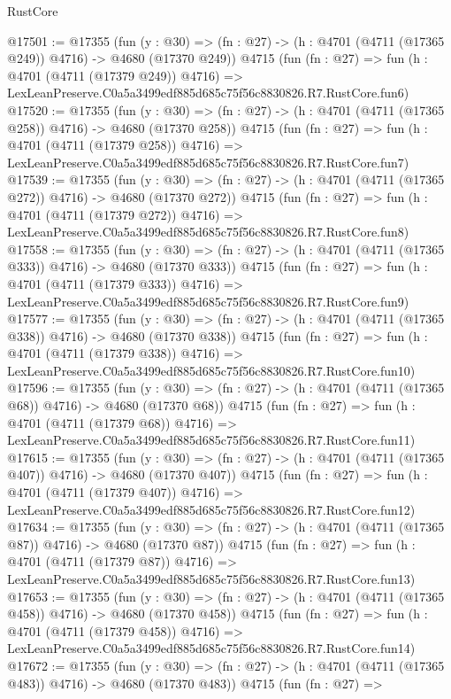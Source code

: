 \begin{lexlean}{RustCore}
\begin{coremodule}
@17501 := @17355
    (fun (y : @30) => (fn : @27) -> (h : @4701 (@4711 (@17365 @249)) @4716) -> @4680 (@17370 @249))
    @4715
    (fun (fn : @27) =>
    fun (h : @4701 (@4711 (@17379 @249)) @4716) =>
    LexLeanPreserve.C0a5a3499edf885d685c75f56c8830826.R7.RustCore.fun6)
@17520 := @17355
    (fun (y : @30) => (fn : @27) -> (h : @4701 (@4711 (@17365 @258)) @4716) -> @4680 (@17370 @258))
    @4715
    (fun (fn : @27) =>
    fun (h : @4701 (@4711 (@17379 @258)) @4716) =>
    LexLeanPreserve.C0a5a3499edf885d685c75f56c8830826.R7.RustCore.fun7)
@17539 := @17355
    (fun (y : @30) => (fn : @27) -> (h : @4701 (@4711 (@17365 @272)) @4716) -> @4680 (@17370 @272))
    @4715
    (fun (fn : @27) =>
    fun (h : @4701 (@4711 (@17379 @272)) @4716) =>
    LexLeanPreserve.C0a5a3499edf885d685c75f56c8830826.R7.RustCore.fun8)
@17558 := @17355
    (fun (y : @30) => (fn : @27) -> (h : @4701 (@4711 (@17365 @333)) @4716) -> @4680 (@17370 @333))
    @4715
    (fun (fn : @27) =>
    fun (h : @4701 (@4711 (@17379 @333)) @4716) =>
    LexLeanPreserve.C0a5a3499edf885d685c75f56c8830826.R7.RustCore.fun9)
@17577 := @17355
    (fun (y : @30) => (fn : @27) -> (h : @4701 (@4711 (@17365 @338)) @4716) -> @4680 (@17370 @338))
    @4715
    (fun (fn : @27) =>
    fun (h : @4701 (@4711 (@17379 @338)) @4716) =>
    LexLeanPreserve.C0a5a3499edf885d685c75f56c8830826.R7.RustCore.fun10)
@17596 := @17355
    (fun (y : @30) => (fn : @27) -> (h : @4701 (@4711 (@17365 @68)) @4716) -> @4680 (@17370 @68))
    @4715
    (fun (fn : @27) =>
    fun (h : @4701 (@4711 (@17379 @68)) @4716) =>
    LexLeanPreserve.C0a5a3499edf885d685c75f56c8830826.R7.RustCore.fun11)
@17615 := @17355
    (fun (y : @30) => (fn : @27) -> (h : @4701 (@4711 (@17365 @407)) @4716) -> @4680 (@17370 @407))
    @4715
    (fun (fn : @27) =>
    fun (h : @4701 (@4711 (@17379 @407)) @4716) =>
    LexLeanPreserve.C0a5a3499edf885d685c75f56c8830826.R7.RustCore.fun12)
@17634 := @17355
    (fun (y : @30) => (fn : @27) -> (h : @4701 (@4711 (@17365 @87)) @4716) -> @4680 (@17370 @87))
    @4715
    (fun (fn : @27) =>
    fun (h : @4701 (@4711 (@17379 @87)) @4716) =>
    LexLeanPreserve.C0a5a3499edf885d685c75f56c8830826.R7.RustCore.fun13)
@17653 := @17355
    (fun (y : @30) => (fn : @27) -> (h : @4701 (@4711 (@17365 @458)) @4716) -> @4680 (@17370 @458))
    @4715
    (fun (fn : @27) =>
    fun (h : @4701 (@4711 (@17379 @458)) @4716) =>
    LexLeanPreserve.C0a5a3499edf885d685c75f56c8830826.R7.RustCore.fun14)
@17672 := @17355
    (fun (y : @30) => (fn : @27) -> (h : @4701 (@4711 (@17365 @483)) @4716) -> @4680 (@17370 @483))
    @4715
    (fun (fn : @27) =>

\end{coremodule}
\end{lexlean}
